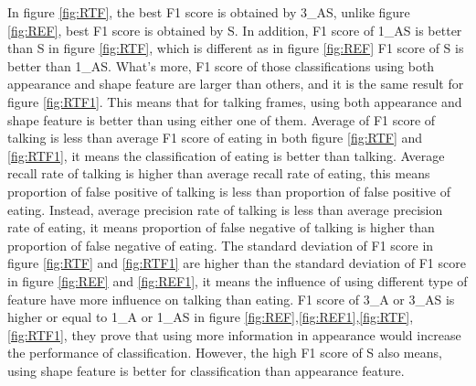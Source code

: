 \newline
In figure \ref{fig:RTF}, the best F1 score is obtained by 3\_AS, unlike figure \ref{fig:REF}, best F1 score is obtained by S. In addition, F1 score of 1\_AS  is better than S in figure \ref{fig:RTF}, which is different as in figure \ref{fig:REF} F1 score of S is better than 1\_AS. What's more, F1 score of those classifications using both appearance and shape feature are larger than others, and it is the same result for figure \ref{fig:RTF1}. This means that for talking frames, using both appearance and shape feature is better than using either one of them. Average of F1 score of talking is less than average F1 score of eating in both figure \ref{fig:RTF} and \ref{fig:RTF1}, it means the classification of eating is better than talking. Average recall rate of talking is higher than average recall rate of  eating, this means proportion of false positive of talking is less than proportion of false positive of eating. Instead, average precision rate of talking is less than average precision rate of eating, it means proportion of false negative of talking is higher than proportion of false negative of eating. The standard deviation of F1 score in figure \ref{fig:RTF} and \ref{fig:RTF1} are higher than the standard deviation of F1 score in figure \ref{fig:REF} and \ref{fig:REF1}, it means the influence of using different type of feature have more influence on talking than eating. F1 score of 3\_A or 3\_AS is higher or equal to 1\_A or 1\_AS in figure \ref{fig:REF},\ref{fig:REF1},\ref{fig:RTF},\ref{fig:RTF1}, they prove that using  more information in appearance would increase the performance of classification. However, the high F1 score of S also means, using shape feature is better for classification than appearance feature.
